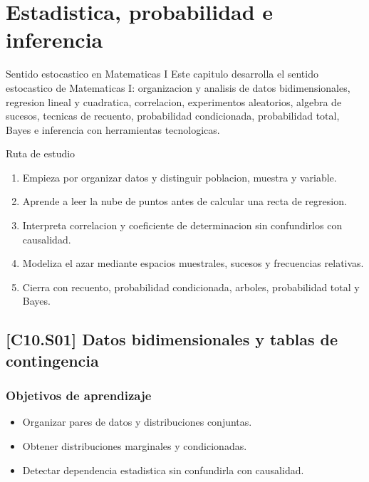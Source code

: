 \chapter{Estadistica, probabilidad e inferencia}

\begin{theorybox}{Sentido estocastico en Matematicas I}
Este capitulo desarrolla el sentido estocastico de Matematicas I: organizacion y analisis de
datos bidimensionales, regresion lineal y cuadratica, correlacion, experimentos aleatorios,
algebra de sucesos, tecnicas de recuento, probabilidad condicionada, probabilidad total,
Bayes e inferencia con herramientas tecnologicas.
\end{theorybox}

\begin{methodbox}{Ruta de estudio}
\begin{enumerate}
  \item Empieza por organizar datos y distinguir poblacion, muestra y variable.
  \item Aprende a leer la nube de puntos antes de calcular una recta de regresion.
  \item Interpreta correlacion y coeficiente de determinacion sin confundirlos con causalidad.
  \item Modeliza el azar mediante espacios muestrales, sucesos y frecuencias relativas.
  \item Cierra con recuento, probabilidad condicionada, arboles, probabilidad total y Bayes.
\end{enumerate}
\end{methodbox}

\section{[C10.S01] Datos bidimensionales y tablas de contingencia}

\subsection*{Objetivos de aprendizaje}
\begin{itemize}
  \item Organizar pares de datos y distribuciones conjuntas.
  \item Obtener distribuciones marginales y condicionadas.
  \item Detectar dependencia estadistica sin confundirla con causalidad.
\end{itemize}

